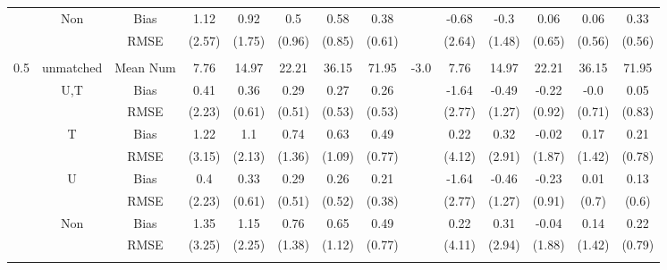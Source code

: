 \begin{tabular}{@{\extracolsep{5pt}}lc|cccccc|lccccc}
 & Non & Bias & 1.12 & 0.92 & 0.5 & 0.58 & 0.38 &  & -0.68 & -0.3 & 0.06 & 0.06 & 0.33 \\
 &  & RMSE & (2.57) & (1.75) & (0.96) & (0.85) & (0.61) &  & (2.64) & (1.48) & (0.65) & (0.56) & (0.56) \\
 &  &  &  &  &  &  &  &  &  &  &  &  &  \\
0.5 & unmatched & Mean Num & 7.76 & 14.97 & 22.21 & 36.15 & 71.95 & -3.0 & 7.76 & 14.97 & 22.21 & 36.15 & 71.95 \\
 & U,T & Bias & 0.41 & 0.36 & 0.29 & 0.27 & 0.26 &  & -1.64 & -0.49 & -0.22 & -0.0 & 0.05 \\
 &  & RMSE & (2.23) & (0.61) & (0.51) & (0.53) & (0.53) &  & (2.77) & (1.27) & (0.92) & (0.71) & (0.83) \\
 & T & Bias & 1.22 & 1.1 & 0.74 & 0.63 & 0.49 &  & 0.22 & 0.32 & -0.02 & 0.17 & 0.21 \\
 &  & RMSE & (3.15) & (2.13) & (1.36) & (1.09) & (0.77) &  & (4.12) & (2.91) & (1.87) & (1.42) & (0.78) \\
 & U & Bias & 0.4 & 0.33 & 0.29 & 0.26 & 0.21 &  & -1.64 & -0.46 & -0.23 & 0.01 & 0.13 \\
 &  & RMSE & (2.23) & (0.61) & (0.51) & (0.52) & (0.38) &  & (2.77) & (1.27) & (0.91) & (0.7) & (0.6) \\
 & Non & Bias & 1.35 & 1.15 & 0.76 & 0.65 & 0.49 &  & 0.22 & 0.31 & -0.04 & 0.14 & 0.22 \\
 &  & RMSE & (3.25) & (2.25) & (1.38) & (1.12) & (0.77) &  & (4.11) & (2.94) & (1.88) & (1.42) & (0.79) \\
 &  &  &  &  &  &  &  &  &  &  &  &  &  \\
\hline 
\bottomrule 
\end{tabular}
